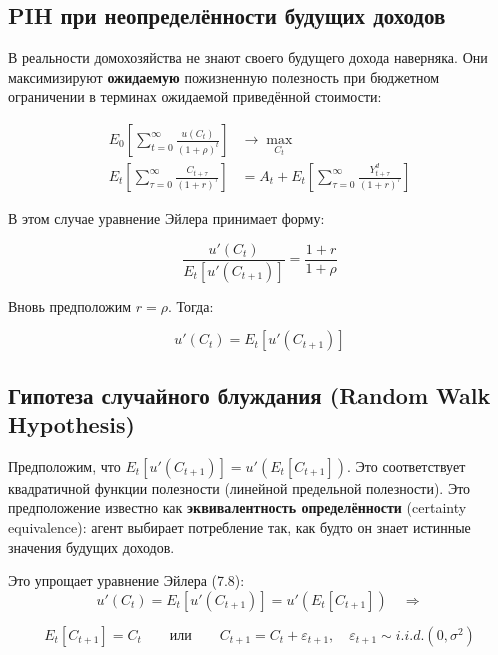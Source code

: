 \documentclass[10pt,a4paper]{article}
\begin{document}
\subsection{PIH при неопределённости будущих доходов}

В реальности домохозяйства не знают своего будущего дохода наверняка. Они максимизируют \textbf{ожидаемую} пожизненную полезность при бюджетном ограничении в терминах ожидаемой приведённой стоимости:
\begin{formulabox}
\begin{align}
E_0\left[\sum_{t=0}^{\infty} \frac{u(C_t)}{(1+\rho)^t}\right] &\to \max_{C_t} \tag{7.5}\\
E_t\left[\sum_{\tau=0}^{\infty}\frac{C_{t+\tau}}{(1+r)^\tau}\right] &= A_t + E_t\left[\sum_{\tau=0}^{\infty}\frac{Y_{t+\tau}^{d}}{(1+r)^\tau}\right] \tag{7.6}
\end{align}
\end{formulabox}

В этом случае уравнение Эйлера принимает форму:
\begin{formulabox}
\begin{equation}
\frac{u'(C_t)}{E_t[u'(C_{t+1})]} = \frac{1+r}{1+\rho} \tag{7.7}
\end{equation}
\end{formulabox}

Вновь предположим $r=\rho$. Тогда:
\begin{formulabox}
\begin{equation}
u'(C_t) = E_t[u'(C_{t+1})] \tag{7.8}
\end{equation}
\end{formulabox}

\subsection{Гипотеза случайного блуждания (Random Walk Hypothesis)}

Предположим, что $E_t[u'(C_{t+1})] = u'(E_t[C_{t+1}])$. Это соответствует квадратичной функции полезности (линейной предельной полезности). Это предположение известно как \textbf{эквивалентность определённости} (certainty equivalence): агент выбирает потребление так, как будто он знает истинные значения будущих доходов.

Это упрощает уравнение Эйлера (7.8):
$$u'(C_t) = E_t[u'(C_{t+1})] = u'(E_t[C_{t+1}]) \quad \Rightarrow$$
\begin{formulabox}
\begin{equation}
E_t[C_{t+1}] = C_t \qquad \text{или} \qquad C_{t+1} = C_t + \varepsilon_{t+1},\quad \varepsilon_{t+1}\sim i.i.d.(0,\sigma^2) \tag{7.9}
\end{equation}
\end{formulabox}
\end{document}
